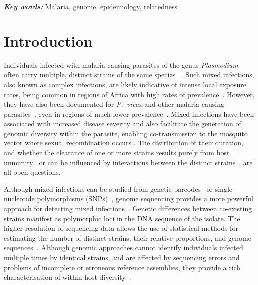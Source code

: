 \documentclass[9pt,lineno]{elife}
\providecommand{\keywords}[1]{\textbf{\textit{Key words:}} #1}
\begin{document}
\keywords{Malaria, genome, epidemiology, relatedness}


\section{Introduction}

Individuals infected with malaria-causing parasites of the genus {\it Plasmodium} often carry multiple, distinct strains of the same species ~\citep{Bell2006}.  Such mixed infections, also known as complex infections, are likely indicative of intense local exposure rates, being common in regions of Africa with high rates of prevalence~\citep{Howes2016}. However, they have also been documented for {\it P.~vivax} and other malaria-causing parasites~\citep{Mueller2007, Collins2012}, even in regions of much lower prevalence~\citep{Howes2016, Steenkeste2010}.  Mixed infections have been associated with increased disease severity \citep{deRoode2005} and also facilitate the generation of genomic diversity within the parasite, enabling co-transmission to the mosquito vector where sexual recombination occurs \citep{Mzilahowa2007}.  The distribution of their duration, and whether the clearance of one or more strains results purely from host immunity~\citep{Borrmann2011} or can be influenced by interactions between the distinct strains~\citep{Enosse2006, Bushman2016}, are all open questions.

Although mixed infections can be studied from genetic barcodes~\citep{Galinsky2015} or single nucleotide polymorphisms (SNPs)~\citep{Jack2016}, genome sequencing provides a more powerful approach for detecting mixed infections~\citep{Chang2017}.  Genetic differences between co-existing strains manifest as polymorphic loci in the DNA sequence of the isolate. The higher resolution of sequencing data allows the use of statistical methods for estimating the number of distinct strains, their relative proportions, and genome sequences~\citep{Zhu2017}.  Although genomic approaches cannot identify individuals infected multiple times by identical strains, and are affected by sequencing errors and problems of incomplete or erroneous reference assemblies, they provide a rich characterisation of within host diversity~\citep{Manske2012, auburn2012characterization, Pearson2016}.
\end{document}
